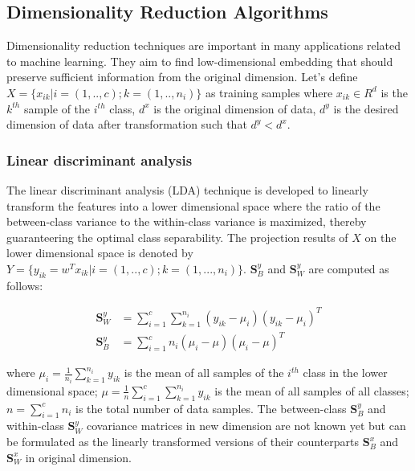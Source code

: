 
\subsection{Dimensionality Reduction Algorithms}

    Dimensionality reduction techniques are important in many applications related to machine learning.
    They aim to find low-dimensional embedding that should preserve sufficient information from the original dimension.
    Let's define $X = \{x_{ik}|i=(1,..,c);k=(1,..,n_{i})\}$ as training samples where $x_{ik} \in R^{d}$ is the $k^{th}$ sample of the $i^{th}$ class, $d^x$ is the original dimension of data, $d^y$ is the desired dimension of data after transformation such that $d^y < d^x$.

    \subsubsection{Linear discriminant analysis}
        The linear discriminant analysis (LDA) technique is developed to linearly transform the features into a lower dimensional space where the ratio of the between-class variance to the within-class variance is maximized, thereby guaranteering the optimal class separability.
        The projection results of $X$ on the lower dimensional space is denoted by $Y = \{y_{ik} = w^T x_{ik}|i=(1,..,c); k=(1,...,n_{i})\}$. $\boldsymbol{S}_B^y$ and $\boldsymbol{S}_W^y$ are computed as follows: 

        \begin{align}
            \boldsymbol{S}_W^y &= \sum_{i=1}^{c}\sum_{k=1}^{n_{i}}(y_{ik}-\mu_i)(y_{ik}-\mu_i)^T \label{eq:LDA_Sw_y}\\
            \boldsymbol{S}_B^y &= \sum_{i=1}^{c}n_i(\mu_i - \mu)(\mu_i - \mu)^T \label{eq:LDA_Sb_y}
        \end{align}

        where $\mu_i=\frac{1}{n_i}{\sum_{k=1}^{n_{i}}}{y_{ik}}$ is the mean of all samples of the $i^{th}$ class in the lower dimensional space; $\mu=\frac{1}{n}\sum_{i=1}^{c}{\sum_{k=1}^{n_{i}}{y_{ik}}}$ is the mean of all samples of all classes; $n=\sum_{i=1}^{c}n_i$ is the total number of data samples.
        The between-class $\boldsymbol{S}_B^y$ and within-class $\boldsymbol{S}_W^y$ covariance matrices in new dimension are not known yet but can be formulated as the linearly transformed versions of their counterparts $\boldsymbol{S}_B^x$ and $\boldsymbol{S}_W^x$ in original dimension.

